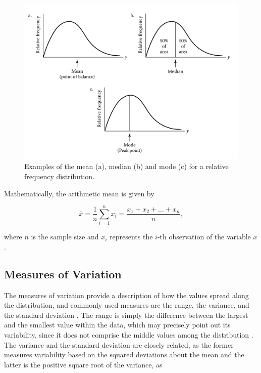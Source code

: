 \begin{figure}[H]
	\centering
	\caption{\label{fig:central_tendency} Examples of the mean (a), median (b) and mode (c) for a relative frequency distribution.}
	\begin{center}
    \includegraphics[scale=0.4]{images/central_tendency.png}
	\end{center}
	\centering
\end{figure}

Mathematically, the arithmetic mean is given by

\begin{equation}
\label{eqn:arithmetic_mean}
\bar{x} = \frac{1}{n} \sum_{i=1}^{n} x_{i} = \frac{x_{1} + x_{2} + \dots + x_{n}}{n},
\end{equation}

\noindent where $n$ is the sample size and $x_{i}$ represents the $i$-th observation of the variable $x$ \cite{zwillinger1999crc}.

\subsection{Measures of Variation}

The measures of variation provide a description of how the values spread along the distribution, and commonly used measures are the range, the variance, and the standard deviation \cite{mendenhall2016statistics}. The range is simply the difference between the largest and the smallest value within the data, which may precisely point out its variability, since it does not comprise the middle values among the distribution \cite{devore2011probability}. The variance and the standard deviation are closely related, as the former measures variability based on the squared deviations about
the mean and the latter is the positive square root of the variance, as

